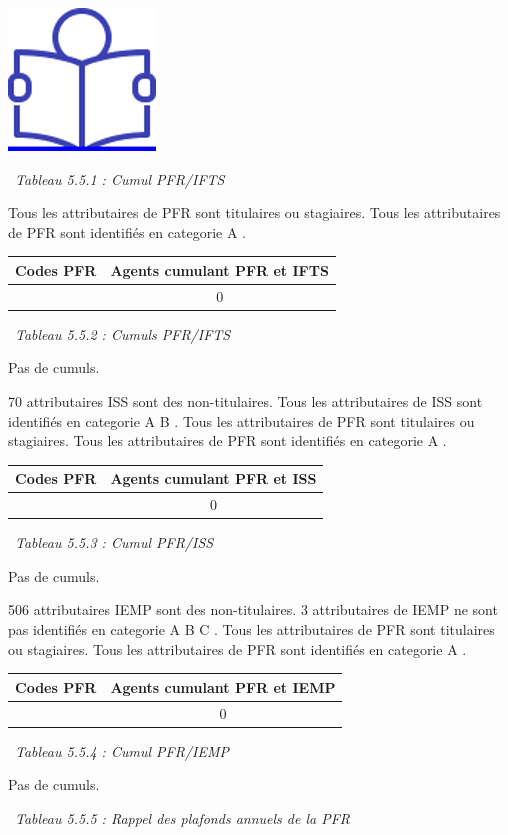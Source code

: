 \href{../Docs/Notices/fiche_PFR.odt}{\includegraphics{icones/Notice.png}}

~\emph{Tableau 5.5.1 : Cumul PFR/IFTS}

Tous les attributaires de PFR sont titulaires ou stagiaires. Tous les
attributaires de PFR sont identifiés en categorie A .

\begin{longtable}[]{@{}cc@{}}
\toprule
Codes PFR & Agents cumulant PFR et IFTS\tabularnewline
\midrule
\endhead
& 0\tabularnewline
\bottomrule
\end{longtable}

~\emph{Tableau 5.5.2 : Cumuls PFR/IFTS}

Pas de cumuls.

70 attributaires ISS sont des non-titulaires. Tous les attributaires de
ISS sont identifiés en categorie A B . Tous les attributaires de PFR
sont titulaires ou stagiaires. Tous les attributaires de PFR sont
identifiés en categorie A .

\begin{longtable}[]{@{}cc@{}}
\toprule
Codes PFR & Agents cumulant PFR et ISS\tabularnewline
\midrule
\endhead
& 0\tabularnewline
\bottomrule
\end{longtable}

~\emph{Tableau 5.5.3 : Cumul PFR/ISS}

Pas de cumuls.

506 attributaires IEMP sont des non-titulaires. 3 attributaires de IEMP
ne sont pas identifiés en categorie A B C . Tous les attributaires de
PFR sont titulaires ou stagiaires. Tous les attributaires de PFR sont
identifiés en categorie A .

\begin{longtable}[]{@{}cc@{}}
\toprule
Codes PFR & Agents cumulant PFR et IEMP\tabularnewline
\midrule
\endhead
& 0\tabularnewline
\bottomrule
\end{longtable}

~\emph{Tableau 5.5.4 : Cumul PFR/IEMP}

Pas de cumuls.

~\emph{Tableau 5.5.5 : Rappel des plafonds annuels de la PFR}

